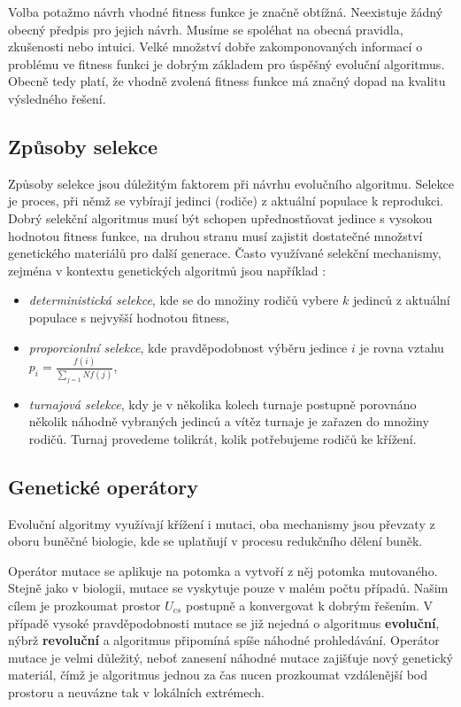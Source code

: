 Volba potažmo návrh vhodné fitness funkce je značně obtížná. Neexistuje žádný obecný
předpis pro jejich návrh. Musíme se spoléhat na obecná pravidla, zkušenosti nebo 
intuici. Velké množství dobře zakomponovaných informací o problému ve fitness funkci je
dobrým základem pro úspěšný evoluční algoritmus. Obecně tedy platí, že 
vhodně zvolená fitness funkce má značný dopad na kvalitu výsledného řešení.

\subsection{Způsoby selekce}
Způsoby selekce jsou důležitým faktorem při návrhu evolučního algoritmu. Selekce
je proces, při němž se vybírají jedinci (rodiče) z aktuální populace k reprodukci. 
Dobrý selekční algoritmus musí být schopen upřednostňovat jedince s vysokou hodnotou
fitness funkce, na druhou stranu musí zajistit dostatečné množství genetického 
materiálů pro další generace. Často využívané selekční mechanismy, zejména v kontextu
genetických algoritmů jsou například \cite{selection_schemes_comparison}:

\begin{itemize}
	\item \textit{deterministická selekce}, kde se do množiny rodičů vybere $k$
		jedinců z aktuální populace s nejvyšší hodnotou fitness,
		
	\item \textit{proporcionlní selekce}, kde pravděpodobnost výběru jedince $i$ je 
		rovna vztahu $p_{i} = \frac{f(i)}{\sum_{j=1}{N} f(j)}$,
		
	\item \textit{turnajová selekce}, kdy je v několika kolech turnaje postupně 
		porovnáno několik náhodně vybraných jedinců a vítěz turnaje je zařazen
		do množiny rodičů. Turnaj provedeme tolikrát, kolik potřebujeme rodičů
		ke křížení.
\end{itemize}

\subsection{Genetické operátory}
Evoluční algoritmy využívají křížení i mutaci, oba mechanismy jsou převzaty z
oboru buněčné biologie, kde se uplatňují v procesu redukčního dělení buněk.

Operátor mutace se aplikuje na potomka
a vytvoří z něj potomka mutovaného. Stejně jako v biologii, mutace se vyskytuje
pouze v malém počtu případů. Našim cílem je prozkoumat prostor $U_{cs}$ postupně a
konvergovat k dobrým řešením. V případě vysoké pravděpodobnosti mutace se již
nejedná o algoritmus \textbf{evoluční}, nýbrž \textbf{revoluční} a algoritmus připomíná 
spíše náhodné prohledávání. Operátor mutace je velmi důležitý, neboť zanesení
náhodné mutace zajišťuje nový genetický materiál, čímž je algoritmus jednou za
čas nucen prozkoumat vzdálenější bod prostoru a neuvázne tak v lokálních extrémech.

